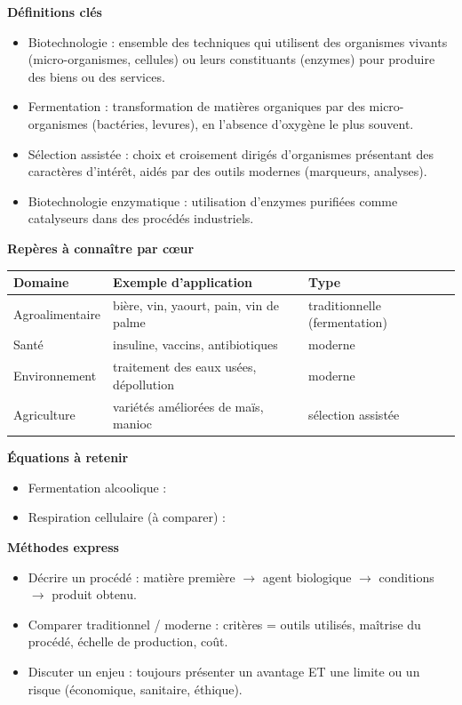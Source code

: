 \documentclass[11pt]{article}
\newcommand{\cle}[1]{{\popxbold\color{popdark}#1}}
\begin{document}
\begin{bilan}
\textbf{Définitions clés}
\begin{itemize}
  \item \cle{Biotechnologie} : ensemble des techniques qui utilisent des organismes vivants (micro-organismes, cellules) ou leurs constituants (enzymes) pour produire des biens ou des services.
  \item \cle{Fermentation} : transformation de matières organiques par des micro-organismes (bactéries, levures), en l'absence d'oxygène le plus souvent.
  \item \cle{Sélection assistée} : choix et croisement dirigés d'organismes présentant des caractères d'intérêt, aidés par des outils modernes (marqueurs, analyses).
  \item \cle{Biotechnologie enzymatique} : utilisation d'enzymes purifiées comme catalyseurs dans des procédés industriels.
\end{itemize}

\textbf{Repères à connaître par cœur}
\begin{center}
\begin{tabularx}{\linewidth}{|l|X|X|}
\hline
\rowcolor{popblueL} \textbf{Domaine} & \textbf{Exemple d'application} & \textbf{Type} \\
\hline
Agroalimentaire & bière, vin, yaourt, pain, vin de palme & traditionnelle (fermentation) \\
\hline
Santé & insuline, vaccins, antibiotiques & moderne \\
\hline
Environnement & traitement des eaux usées, dépollution & moderne \\
\hline
Agriculture & variétés améliorées de maïs, manioc & sélection assistée \\
\hline
\end{tabularx}
\end{center}

\textbf{Équations à retenir}
\begin{itemize}
  \item Fermentation alcoolique : 
  \item Respiration cellulaire (à comparer) : 
\end{itemize}

\textbf{Méthodes express}
\begin{itemize}
  \item Décrire un procédé : matière première $\to$ agent biologique $\to$ conditions $\to$ produit obtenu.
  \item Comparer traditionnel / moderne : critères = outils utilisés, maîtrise du procédé, échelle de production, coût.
  \item Discuter un enjeu : toujours présenter un avantage ET une limite ou un risque (économique, sanitaire, éthique).
\end{itemize}
\end{bilan}
\end{document}
